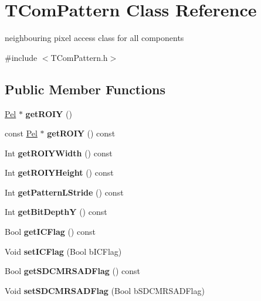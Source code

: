 \hypertarget{class_t_com_pattern}{}\section{T\+Com\+Pattern Class Reference}
\label{class_t_com_pattern}


neighbouring pixel access class for all components  




{\ttfamily \#include $<$T\+Com\+Pattern.\+h$>$}

\subsection*{Public Member Functions}
\begin{DoxyCompactItemize}
\item 
\mbox{\label{class_t_com_pattern_a4ee5282b5639f33b82c432305666f9e9}} 
\hyperlink{_type_def_8h_af92141699657699b4b547be0c8517541}{Pel} $\ast$ {\bfseries get\+R\+O\+IY} ()
\item 
\mbox{\label{class_t_com_pattern_a75b00a4f3b837cd12800a121b8fd5495}} 
const \hyperlink{_type_def_8h_af92141699657699b4b547be0c8517541}{Pel} $\ast$ {\bfseries get\+R\+O\+IY} () const
\item 
\mbox{\label{class_t_com_pattern_a1e55238c5278c1662703dfcf0ad82a1a}} 
Int {\bfseries get\+R\+O\+I\+Y\+Width} () const
\item 
\mbox{\label{class_t_com_pattern_aec5a8f04c7436526b3172d6257d83c5f}} 
Int {\bfseries get\+R\+O\+I\+Y\+Height} () const
\item 
\mbox{\label{class_t_com_pattern_a576e4ef425cccdcc84377708ad2f38ac}} 
Int {\bfseries get\+Pattern\+L\+Stride} () const
\item 
\mbox{\label{class_t_com_pattern_a4d8e80175fc540b4709ec58a95788e89}} 
Int {\bfseries get\+Bit\+DepthY} () const
\item 
\mbox{\label{class_t_com_pattern_aa19ab29b28bf9160662267ca819ca6b2}} 
Bool {\bfseries get\+I\+C\+Flag} () const
\item 
\mbox{\label{class_t_com_pattern_a4e271f0157066a52fe960eb43c86e419}} 
Void {\bfseries set\+I\+C\+Flag} (Bool b\+I\+C\+Flag)
\item 
\mbox{\label{class_t_com_pattern_a46484cc642d58589bf79d1cf20a9ed36}} 
Bool {\bfseries get\+S\+D\+C\+M\+R\+S\+A\+D\+Flag} () const
\item 
\mbox{\label{class_t_com_pattern_af779110ac947b28e053473117b0cbee2}} 
Void {\bfseries set\+S\+D\+C\+M\+R\+S\+A\+D\+Flag} (Bool b\+S\+D\+C\+M\+R\+S\+A\+D\+Flag)
\end{DoxyCompactItemize}
